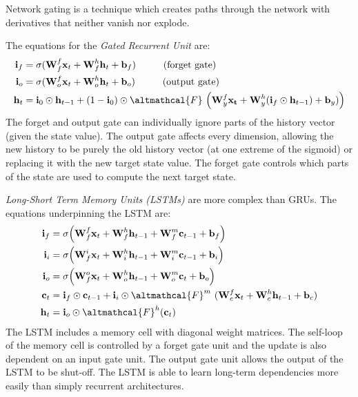 \documentclass[a4paper]{book}
\newcommand{\vect}[1]{\boldsymbol{\mathbf{#1}}}
\newcommand{\marfig}[2]{
  \marginpar{ \texttt{[image: \#1]} \centering \text{\small #2} }
}
\begin{document}
Network gating is a technique which creates paths through the network with derivatives that neither vanish nor explode. 

\marfig{figs/GRU}{}The equations for the \emph{Gated Recurrent Unit} are:
\begin{align}
\vect{i}_f &= \sigma(\vect{W}_{f}^{f} \vect{x}_t + \vect{W}_{f}^{h} \vect{h}_t + \vect{b}_f) \hspace{1cm} \text{(forget gate)} \\
\vect{i}_o &= \sigma(\vect{W}_{o}^{f} \vect{x}_t + \vect{W}_{o}^{h} \vect{h}_t + \vect{b}_o) \hspace{1cm} \text{(output gate)} \\
\vect{h}_t &= \vect{i}_0 \odot \vect{h}_{t-1} + (1 - \vect{i}_0) \odot \altmathcal{F}\ \Big( \vect{W}^{f}_{y} \vect{x_t} +  \vect{W}^{h}_{y} (\vect{i}_f \odot \vect{h}_{t-1}) + \vect{b}_y) \Big)
\end{align}
The forget and output gate can individually ignore parts of the history vector (given the state value). The output gate affects every dimension, allowing the new history to be purely the old history vector (at one extreme of the sigmoid) or replacing it with the new target state value. The forget gate controls which parts of the state are used to compute the next target state.

\marfig{figs/LSTM}{Long-Short Term Memory Units}\emph{Long-Short Term Memory Units (LSTMs)} are more complex than GRUs. The equations underpinning the LSTM are:
\begin{align}
\vect{i}_f &= \sigma\Big( \vect{W}_{f}^{f}\vect{x}_t + \vect{W}_{f}^{h} \vect{h}_{t-1} + \vect{W}_{f}^{m} \vect{c}_{t-1} + \vect{b}_{f}  \Big) \\
\vect{i}_i &= \sigma\Big( \vect{W}_{f}^{i}\vect{x}_t + \vect{W}_{i}^{h} \vect{h}_{t-1} + \vect{W}_{i}^{m} \vect{c}_{t-1} + \vect{b}_{i}  \Big) \\
\vect{i}_o &= \sigma\Big( \vect{W}_{f}^{o}\vect{x}_t + \vect{W}_{o}^{h} \vect{h}_{t-1} + \vect{W}_{o}^{m} \vect{c}_{t} + \vect{b}_{o}  \Big) \\
\vect{c}_t &= \vect{i}_f \odot \vect{c}_{t-1} + \vect{i}_i \odot \altmathcal{F}^{m}\ (\vect{W}_{c}^{f} \vect{x}_t + \vect{W}_{c}^{h} \vect{h}_{t-1} + \vect{b}_c ) \\
\vect{h}_t &= \vect{i}_o \odot \altmathcal{F}^h (\vect{c}_t)
\end{align}
The LSTM includes a memory cell with diagonal weight matrices. The self-loop of the memory cell is controlled by a forget gate unit and the update is also dependent on an input gate unit. The output gate unit allows the output of the LSTM to be shut-off. The LSTM is able to learn long-term dependencies more easily than simply recurrent architectures. 
\end{document}
